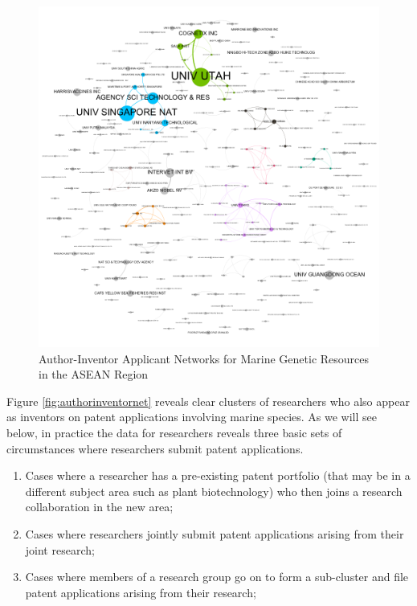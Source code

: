 \documentclass[]{book}
\providecommand{\tightlist}{%
  \setlength{\itemsep}{0pt}\setlength{\parskip}{0pt}}
\theoremstyle{definition}
\theoremstyle{definition}
\theoremstyle{definition}
\theoremstyle{remark}
\begin{document}
\begin{figure}

{\centering \includegraphics[width=1\linewidth]{images-patents/author_inventor_applicants_network} 

}

\caption{Author-Inventor Applicant Networks for Marine Genetic Resources in the ASEAN Region}\label{fig:authorapplicantnet}
\end{figure}

Figure \ref{fig:authorinventornet} reveals clear clusters of researchers
who also appear as inventors on patent applications involving marine
species. As we will see below, in practice the data for researchers
reveals three basic sets of circumstances where researchers submit
patent applications.

\begin{enumerate}
\def\labelenumi{\alph{enumi})}
\tightlist
\item
  Cases where a researcher has a pre-existing patent portfolio (that may
  be in a different subject area such as plant biotechnology) who then
  joins a research collaboration in the new area;
\item
  Cases where researchers jointly submit patent applications arising
  from their joint research;
\item
  Cases where members of a research group go on to form a sub-cluster
  and file patent applications arising from their research;
\end{enumerate}
\end{document}
